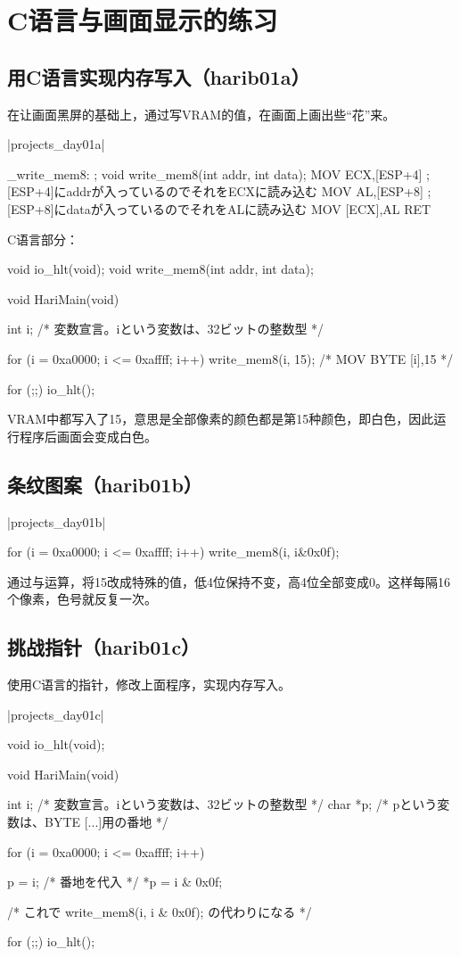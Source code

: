 ﻿\chapter{	C语言与画面显示的练习	}
\section{	用C语言实现内存写入（harib01a）	}
在让画面黑屏的基础上，通过写VRAM的值，在画面上画出些“花”来。

\dag|projects_day\harib01a|
\begin{code}[label=naskfunc.nas]
_write_mem8:	; void write_mem8(int addr, int data);
		MOV		ECX,[ESP+4]		; [ESP+4]にaddrが入っているのでそれをECXに読み込む
		MOV		AL,[ESP+8]		; [ESP+8]にdataが入っているのでそれをALに読み込む
		MOV		[ECX],AL
		RET
\end{code}

C语言部分：
\begin{code}[label=bootpack.c]
void io_hlt(void);
void write_mem8(int addr, int data);

void HariMain(void)
{
	int i; /* 変数宣言。iという変数は、32ビットの整数型 */

	for (i = 0xa0000; i <= 0xaffff; i++) {
		write_mem8(i, 15); /* MOV BYTE [i],15 */
	}

	for (;;) {
		io_hlt();
	}
}
\end{code}

VRAM中都写入了15，意思是全部像素的颜色都是第15种颜色，即白色，因此运行程序后画面会变成白色。
\section{	条纹图案（harib01b）	}
\dag|projects_day\harib01b|
\begin{code}[label=bootpack.c]

	for (i = 0xa0000; i <= 0xaffff; i++) {
		write_mem8(i, i&0x0f); 
	}
\end{code}

通过与运算，将15改成特殊的值，低4位保持不变，高4位全部变成0。这样每隔16个像素，色号就反复一次。


\section{	挑战指针（harib01c）	}
使用C语言的指针，修改上面程序，实现内存写入。

\dag|projects_day\harib01c|
\begin{code}
void io_hlt(void);

void HariMain(void)
{
	int i; /* 変数宣言。iという変数は、32ビットの整数型 */
	char *p; /* pという変数は、BYTE [...]用の番地 */

	for (i = 0xa0000; i <= 0xaffff; i++) {

		p = i; /* 番地を代入 */
		*p = i & 0x0f;

		/* これで write_mem8(i, i & 0x0f); の代わりになる */
	}

	for (;;) {
		io_hlt();
	}
}
\end{code}
